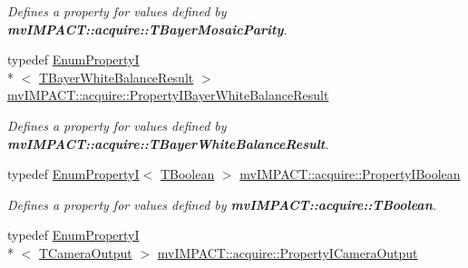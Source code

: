 \begin{DoxyCompactItemize}
\begin{DoxyCompactList}\small\item\em Defines a property for values defined by {\bfseries mv\+I\+M\+P\+A\+C\+T\+::acquire\+::\+T\+Bayer\+Mosaic\+Parity}. \end{DoxyCompactList}\item 
\hypertarget{group___common_interface_ga8d7bb9e61170b53191fa8169cf685e7d}{typedef \hyperlink{classmv_i_m_p_a_c_t_1_1acquire_1_1_enum_property_i}{Enum\+Property\+I}\\*
$<$ \hyperlink{group___common_interface_gac25746f6cbcf893d3ca308d3e978f39d}{T\+Bayer\+White\+Balance\+Result} $>$ \hyperlink{group___common_interface_ga8d7bb9e61170b53191fa8169cf685e7d}{mv\+I\+M\+P\+A\+C\+T\+::acquire\+::\+Property\+I\+Bayer\+White\+Balance\+Result}}\label{group___common_interface_ga8d7bb9e61170b53191fa8169cf685e7d}

\begin{DoxyCompactList}\small\item\em Defines a property for values defined by {\bfseries mv\+I\+M\+P\+A\+C\+T\+::acquire\+::\+T\+Bayer\+White\+Balance\+Result}. \end{DoxyCompactList}\item 
\hypertarget{group___common_interface_ga44f9437e24b21b6c93da9039ec6786aa}{typedef \hyperlink{classmv_i_m_p_a_c_t_1_1acquire_1_1_enum_property_i}{Enum\+Property\+I}$<$ \hyperlink{group___common_interface_ga43c995be18b0dde1eeb4a16849c58968}{T\+Boolean} $>$ \hyperlink{group___common_interface_ga44f9437e24b21b6c93da9039ec6786aa}{mv\+I\+M\+P\+A\+C\+T\+::acquire\+::\+Property\+I\+Boolean}}\label{group___common_interface_ga44f9437e24b21b6c93da9039ec6786aa}

\begin{DoxyCompactList}\small\item\em Defines a property for values defined by {\bfseries mv\+I\+M\+P\+A\+C\+T\+::acquire\+::\+T\+Boolean}. \end{DoxyCompactList}\item 
\hypertarget{group___common_interface_ga48585b26ebc31ccee54f34c7d6bbdda3}{typedef \hyperlink{classmv_i_m_p_a_c_t_1_1acquire_1_1_enum_property_i}{Enum\+Property\+I}\\*
$<$ \hyperlink{group___common_interface_gad85678f02bc0deb0eee9f7ce67644da7}{T\+Camera\+Output} $>$ \hyperlink{group___common_interface_ga48585b26ebc31ccee54f34c7d6bbdda3}{mv\+I\+M\+P\+A\+C\+T\+::acquire\+::\+Property\+I\+Camera\+Output}}\label{group___common_interface_ga48585b26ebc31ccee54f34c7d6bbdda3}


\end{DoxyCompactItemize}
